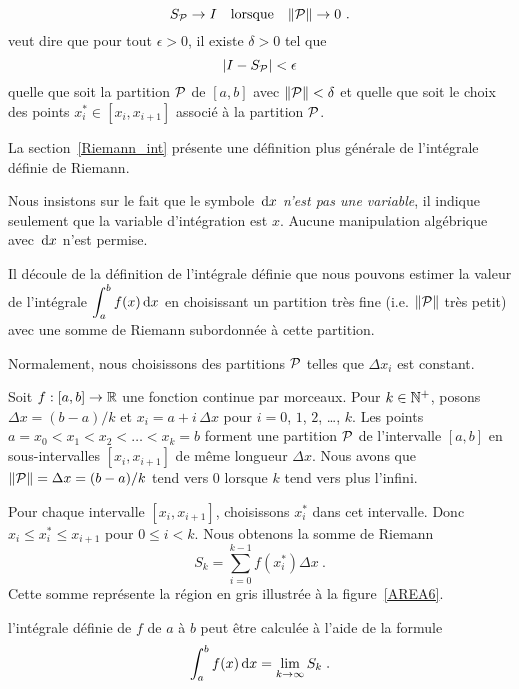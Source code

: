 {\begin{rmk}[\theory]
\[
S_{\cal P} \rightarrow I \quad \text{lorsque}
\quad \|{\cal P}\|\rightarrow 0 \ .
\]
veut dire que pour tout $\epsilon > 0$, il existe $\delta >0$ tel que
\[
\left| I - S_{\cal P} \right| < \epsilon
\]
quelle que soit la partition ${\cal P}$ de $[a,b]$
avec $\|{\cal P}\|<\delta$ et quelle que soit le choix des points
$x_i^\ast \in [x_i, x_{i+1}]$ associé à la partition ${\cal P}$.
\end{rmk}

La section~\ref{Riemann_int} présente une définition plus générale de
l'intégrale définie de Riemann.

Nous insistons sur le fait que le symbole $\,\mathrm{d}x$
{\em n'est pas une variable}, il indique seulement que la variable
d'intégration est $x$.  Aucune manipulation algébrique avec $\,\mathrm{d}x$
n'est permise.

Il découle de la définition de l'intégrale définie que nous pouvons
estimer la valeur de l'intégrale $\displaystyle \int_a^b f(x) \,\mathrm{d}x$
en choisissant un partition très fine (i.e. $\|{\cal P}\|$ très petit)
avec une somme de Riemann subordonnée à cette partition.

Normalement, nous choisissons des partitions ${\cal P}$ telles que
$\Delta x_i$ est constant.

Soit $f:[a,b]\rightarrow \mathbb{R}$ une fonction continue par morceaux.
Pour $k \in \mathbb{N}^+$, posons $\Delta x = (b-a)/k$ et
$x_i = a + i \, \Delta x$ pour $i=0$, $1$, $2$, \ldots, $k$.
Les points $a=x_0 < x_1 < x_2 < \ldots < x_k = b$ forment une
partition ${\cal P}$ de l'intervalle $[a,b]$ en sous-intervalles
$[x_i, x_{i+1}]$ de même longueur $\Delta x$.  Nous avons que
$\displaystyle \|{\cal P}\| = \Delta x = (b-a)/k$
tend vers $0$ lorsque $k$ tend vers plus l'infini.

Pour chaque intervalle $[x_i,x_{i+1}]$, choisissons $x_i^\ast$ dans cet
intervalle.  Donc $x_i \leq x_i^\ast \leq x_{i+1}$ pour $0 \leq i < k$.
Nous obtenons la somme de Riemann
\[
S_k = \sum_{i=0}^{k-1} f(x_i^\ast) \Delta x \ .
\]
Cette somme représente la région en gris illustrée à la figure~\ref{AREA6}.

l'intégrale définie de $f$ de $a$ à $b$ peut être calculée à l'aide de
la formule
\begin{equation}\label{def_int_cpm}
\int_a^b f(x)\,\mathrm{d}x = \lim_{k\rightarrow \infty} S_k \; .
\end{equation}

}
